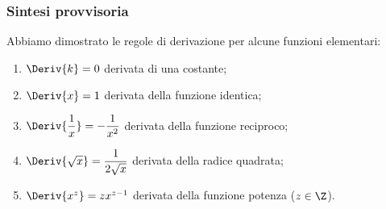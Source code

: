 % 
% 

\subsubsection{Sintesi provvisoria}
\label{subsubsec:diff01_sintesiprovvisoria}
Abbiamo dimostrato le regole di derivazione per alcune funzioni elementari: 
\begin{enumerate} [noitemsep]
\item \(\Deriv{k} = 0\) \tab  derivata di una costante;
\item \(\Deriv{x} = 1\) \tab derivata della funzione identica;
\item \(\Deriv{\dfrac{1}{x}} = -\dfrac{1}{x^2}\) 
  \tab  derivata della funzione reciproco;
\item \(\Deriv{\sqrt{x}} = \dfrac{1}{2\sqrt{x}}\) 
  \tab  derivata della radice quadrata;
\item \(\Deriv{x^z} = z x^{z-1}\) 
  \tab  derivata della funzione potenza (\(z \in \Z\)).
\end{enumerate}

